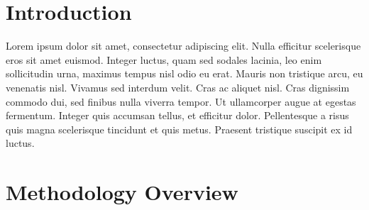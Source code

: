 






\pagestyle{myheadings} %
\markright{\doctitle} %


\thispagestyle{plain} %

\printtitle %


\section*{Introduction} %

Lorem ipsum dolor sit amet, consectetur adipiscing elit. Nulla efficitur scelerisque eros sit amet euismod. Integer luctus, quam sed sodales lacinia, leo enim sollicitudin urna, maximus tempus nisl odio eu erat. Mauris non tristique arcu, eu venenatis nisl. Vivamus sed interdum velit. Cras ac aliquet nisl. Cras dignissim commodo dui, sed finibus nulla viverra tempor. Ut ullamcorper augue at egestas fermentum. Integer quis accumsan tellus, et efficitur dolor. Pellentesque a risus quis magna scelerisque tincidunt et quis metus. Praesent tristique suscipit ex id luctus.


\section{Methodology Overview} %